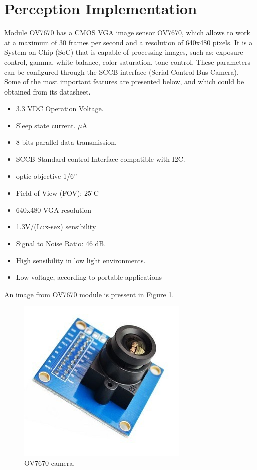 \section{Perception Implementation}
Module OV7670\cite{OV7670} has a CMOS VGA image sensor OV7670, which allows to work at a maximum of 30 frames per second and a resolution of 640x480 pixels. It is a System on Chip (SoC) that is capable of processing images, such as: exposure control, gamma, white balance, color saturation, tone control. These parameters can be configured through the SCCB interface\cite{SCCB} (Serial Control Bus Camera).
Some of the most important features are presented below, and which could be obtained from its datasheet\cite{OV7670}.

\begin{itemize}
	\item 3.3 VDC Operation Voltage. 
	\item Sleep state current. $\mu$A
	\item 8 bits parallel data transmission. 
	\item SCCB Standard control Interface compatible with I2C. 
	\item optic objective 1/6” 
	\item Field of View (FOV): $25^{\circ}$C
	\item 640x480 VGA resolution
	\item 1.3V/(Lux-sex) sensibility 
	\item Signal to Noise Ratio: 46 dB. 
	\item High sensibility in low light environments. 
	\item Low voltage, according to portable applications
\end{itemize}
\newpage
An image from OV7670 module is pressent in Figure \ref{fig:OV7670}.

\begin{figure}[H]
	\center
	\includegraphics[scale=0.4, angle=0]{imagenes/Cuadricoptero_vision/OV7670}
	\caption{OV7670 camera.}
	\label{fig:OV7670}
\end{figure}

